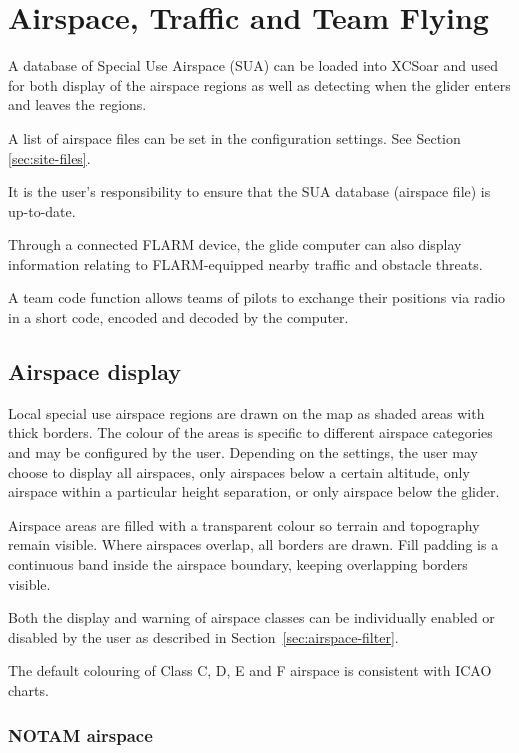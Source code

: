 
\chapter{Airspace, Traffic and Team Flying}\label{cha:airspace}
A database of Special Use Airspace (SUA) can be loaded into XCSoar and
used for both display of the airspace regions as well as detecting
when the glider enters and leaves the regions.

A list of airspace files can be set in the configuration settings.
See Section \ref{sec:site-files}.

It is the user's responsibility to ensure that the SUA database
(air\-space file) is up-to-date.

Through a connected FLARM device, the glide computer can also
display information relating to FLARM-equipped nearby traffic
and obstacle threats.

A team code function allows teams of pilots to exchange their
positions via radio in a short code, encoded and decoded by the
computer.


\section{Airspace display}

Local special use airspace regions are drawn on the map as shaded
areas with thick borders.  The colour of the areas is specific to
different airspace categories and may be configured by the
user.  Depending on the settings, the user may choose to display all
airspaces, only airspaces below a certain altitude, only airspace within a
particular height separation, or only airspace below the glider.

Airspace areas are filled with a transparent colour so terrain and
topography remain visible.  Where airspaces overlap, all borders are
drawn.  Fill padding is a continuous band inside the airspace boundary,
keeping overlapping borders visible.

Both the display and warning of airspace classes can be individually
enabled or disabled by the user as described in
Section~\ref{sec:airspace-filter}.

The default colouring of Class C, D, E and F airspace is consistent
with ICAO charts.


\subsection*{NOTAM airspace}\label{sec:notam-airspace}

